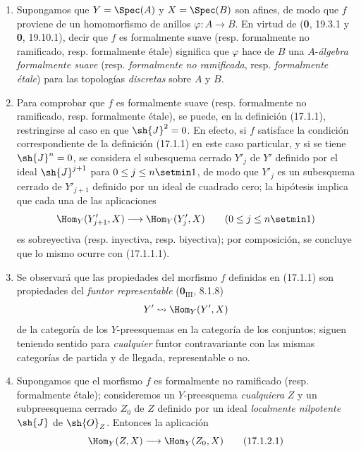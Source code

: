 \begin{remarks}[17.1.2]
\label{IV.17.1.2}
\begin{enumerate}
  \item[(i)] Supongamos que $Y=\Spec(A)$ y $X=\Spec(B)$ son afines, de modo que $f$ proviene de un homomorfismo de anillos $\varphi:A\to B$. En virtud de (\textbf 0, 19.3.1 y \textbf 0, 19.10.1), decir que $f$ es formalmente suave (resp. formalmente no ramificado, resp. formalmente étale) significa que $\varphi$ hace de $B$ una $A$-\emph{álgebra formalmente suave} (resp. \emph{formalmente no ramificada}, resp. \emph{formalmente étale}) para las topologías \emph{discretas} sobre $A$ y $B$.
  \item[(ii)] Para comprobar que $f$ es formalmente suave (resp. formalmente no ramificado, resp. formalmente étale), se puede, en la definición (17.1.1), restringirse al caso en que $\sh{J}^2=0$. En efecto, si $f$ satisface la condición correspondiente de la definición (17.1.1) en este caso particular, y si se tiene $\sh{J}^n=0$, se considera el subesquema cerrado $Y'_j$ de $Y'$ definido por el ideal $\sh{J}^{j+1}$ para $0\leq j\leq n\setmin 1$, de modo que $Y'_j$ es un subesquema cerrado de $Y'_{j+1}$ definido por un ideal de cuadrado cero; la hipótesis implica que cada una de las aplicaciones
  \[
    \Hom_Y(Y'_{j+1},X)\longrightarrow\Hom_Y(Y'_j,X)\qquad(0\leq j\leq n\setmin 1)
  \]
  es sobreyectiva (resp. inyectiva, resp. biyectiva); por composición, se concluye que lo mismo ocurre con (17.1.1.1).
  \item[(iii)] Se observará que las propiedades del morfismo $f$ definidas en (17.1.1) son propiedades del \emph{funtor representable} ($\mathbf{0}_{\mathrm{III}}$, 8.1.8)
  \[
    Y'\leadsto\Hom_Y(Y',X)
  \]
  de la categoría de los $Y$-preesquemas en la categoría de los conjuntos; siguen teniendo sentido para \emph{cualquier} funtor contravariante con las mismas categorías de partida y de llegada, representable o no.
  \item[(iv)] Supongamos que el morfismo $f$ es formalmente no ramificado (resp. formalmente étale); consideremos un $Y$-preesquema \emph{cualquiera} $Z$ y un subpreesquema cerrado $Z_0$ de $Z$ definido por un ideal \emph{localmente nilpotente} $\sh{J}$ de $\sh{O}_Z$. Entonces la aplicación
  \[
  \label{IV.17.1.2.1}
    \Hom_Y(Z,X)\longrightarrow\Hom_Y(Z_0,X)
    \tag{17.1.2.1}
  \]

\end{enumerate}
\end{remarks}
